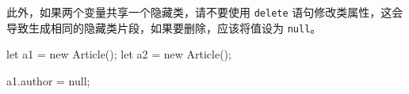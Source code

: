 此外，如果两个变量共享一个隐藏类，请不要使用 \texttt{delete} 语句修改类属性，这会导致生成相同的隐藏类片段，如果要删除，应该将值设为 \texttt{null}。

\begin{JavaScript}
let a1 = new Article();
let a2 = new Article();

a1.author = null;
\end{JavaScript}

